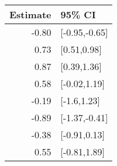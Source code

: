 \begin{tabular}{rl}
  \hline
Estimate & 95\% CI \\ 
  \hline
-0.80 & [-0.95,-0.65] \\ 
  0.73 & [0.51,0.98] \\ 
  0.87 & [0.39,1.36] \\ 
  0.58 & [-0.02,1.19] \\ 
  -0.19 & [-1.6,1.23] \\ 
  -0.89 & [-1.37,-0.41] \\ 
  -0.38 & [-0.91,0.13] \\ 
  0.55 & [-0.81,1.89] \\ 
   \hline
\end{tabular}

